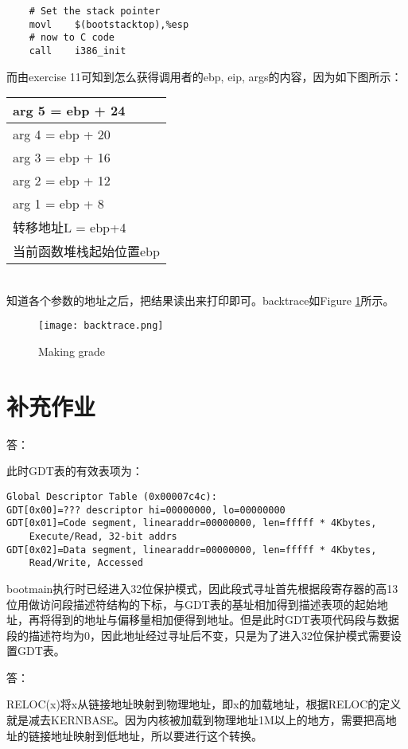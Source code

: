 \documentclass{article}
\begin{document}
{\begin{verbatim}
    # Set the stack pointer
	movl	$(bootstacktop),%esp
	# now to C code
	call	i386_init
\end{verbatim}
而由exercise 11可知到怎么获得调用者的ebp, eip, args的内容，因为如下图所示：\\
\begin{tabular}{|l|}
\hline
arg 5 = ebp + 24 \\
\hline
arg 4 = ebp + 20 \\
\hline
arg 3 = ebp + 16 \\
\hline
arg 2 = ebp + 12 \\
\hline
arg 1 = ebp + 8 \\
\hline
转移地址L = ebp+4 \\
\hline
当前函数堆栈起始位置ebp \\
\hline
\end{tabular}\\
知道各个参数的地址之后，把结果读出来打印即可。backtrace如Figure \ref{fig2}所示。
\begin{figure}[!ht]
\texttt{[image: backtrace.png]}
\caption{Making grade}\label{fig2}
\end{figure}

\section{补充作业}
\begin{Large}答：\end{Large}
此时GDT表的有效表项为：
\begin{verbatim}
Global Descriptor Table (0x00007c4c):
GDT[0x00]=??? descriptor hi=00000000, lo=00000000
GDT[0x01]=Code segment, linearaddr=00000000, len=fffff * 4Kbytes, 
    Execute/Read, 32-bit addrs
GDT[0x02]=Data segment, linearaddr=00000000, len=fffff * 4Kbytes, 
    Read/Write, Accessed
\end{verbatim}
bootmain执行时已经进入32位保护模式，因此段式寻址首先根据段寄存器的高13位用做访问段描述符结构的下标，与GDT表的基址相加得到描述表项的起始地址，再将得到的地址与偏移量相加便得到地址。但是此时GDT表项代码段与数据段的描述符均为0，因此地址经过寻址后不变，只是为了进入32位保护模式需要设置GDT表。\\

\begin{Large}答：\end{Large}
RELOC(x)将x从链接地址映射到物理地址，即x的加载地址，根据RELOC的定义就是减去KERNBASE。因为内核被加载到物理地址1M以上的地方，需要把高地址的链接地址映射到低地址，所以要进行这个转换。\\

}
\end{document}
